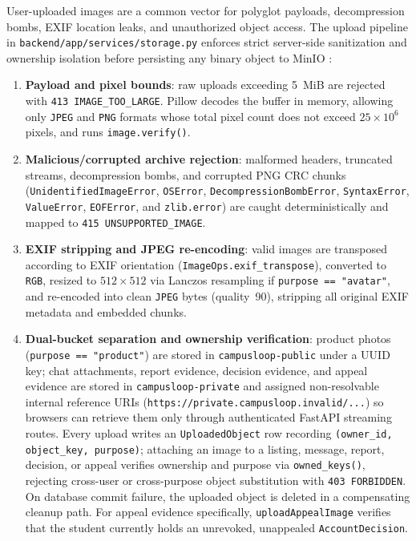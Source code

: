 User-uploaded images are a common vector for polyglot payloads, decompression bombs, EXIF location leaks, and unauthorized object access. The upload pipeline in \texttt{backend/app/\allowbreak services/\allowbreak storage.py} enforces strict server-side sanitization and ownership isolation before persisting any binary object to MinIO \cite{minioDocs}:
\begin{enumerate}
  \item \textbf{Payload and pixel bounds}: raw uploads exceeding 5~MiB are rejected with \texttt{413 IMAGE\_TOO\_LARGE}. Pillow decodes the buffer in memory, allowing only \texttt{JPEG} and \texttt{PNG} formats whose total pixel count does not exceed $25\times 10^{6}$ pixels, and runs \texttt{image.verify()}.
  \item \textbf{Malicious/corrupted archive rejection}: malformed headers, truncated streams, decompression bombs, and corrupted PNG CRC chunks (\texttt{Unidentified\allowbreak ImageError}, \texttt{OSError}, \texttt{Decompression\allowbreak BombError}, \texttt{SyntaxError}, \texttt{ValueError}, \texttt{EOFError}, and \texttt{zlib.error}) are caught deterministically and mapped to \texttt{415 UNSUPPORTED\_IMAGE}.
  \item \textbf{EXIF stripping and JPEG re-encoding}: valid images are transposed according to EXIF orientation (\texttt{ImageOps.exif\_transpose}), converted to \texttt{RGB}, resized to $512\times 512$ via Lanczos resampling if \texttt{purpose == "avatar"}, and re-encoded into clean \texttt{JPEG} bytes (quality~90), stripping all original EXIF metadata and embedded chunks.
  \item \textbf{Dual-bucket separation and ownership verification}: product photos (\texttt{purpose == "product"}) are stored in \texttt{campusloop-public} under a UUID key; chat attachments, report evidence, decision evidence, and appeal evidence are stored in \texttt{campusloop-private} and assigned non-resolvable internal reference URIs (\texttt{https://private.campusloop.invalid/...}) so browsers can retrieve them only through authenticated FastAPI streaming routes. Every upload writes an \texttt{UploadedObject} row recording \texttt{(owner\_id, object\_key, purpose)}; attaching an image to a listing, message, report, decision, or appeal verifies ownership and purpose via \texttt{owned\_keys()}, rejecting cross-user or cross-purpose object substitution with \texttt{403 FORBIDDEN}. On database commit failure, the uploaded object is deleted in a compensating cleanup path. For appeal evidence specifically, \texttt{uploadAppealImage} verifies that the student currently holds an unrevoked, unappealed \texttt{AccountDecision}.
\end{enumerate}

